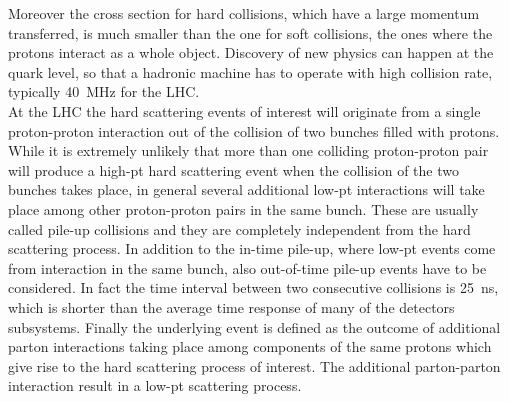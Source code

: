 Moreover the cross section for hard collisions, which have a large momentum transferred, is much smaller than the one for soft collisions, the ones where the protons interact as a whole object. Discovery of new physics can happen at the quark level, so that a hadronic machine has to operate with high collision rate, typically \SI{40}{\mega\hertz} for the LHC.\\
At the LHC the hard scattering events of interest will originate from a single proton-proton interaction out of the collision of two bunches filled with protons. While it is extremely unlikely that more than one colliding proton-proton pair will produce a high-pt hard scattering event when the collision of the two bunches takes place, in general several additional low-pt interactions will take place among other proton-proton pairs in the same bunch. These are usually called pile-up collisions and they are completely independent from the hard scattering process.
In addition to the in-time pile-up, where low-pt events come from interaction in the same bunch, also out-of-time pile-up events have to be considered. In fact the time interval between two consecutive collisions is \SI{25}{\nano\second}, which is shorter than the average time response of many of the detectors subsystems.
Finally the underlying event is defined as the outcome of additional parton interactions taking place among components of the same protons which give rise to the hard scattering process of interest. The additional parton-parton interaction result in a low-pt scattering process. 


